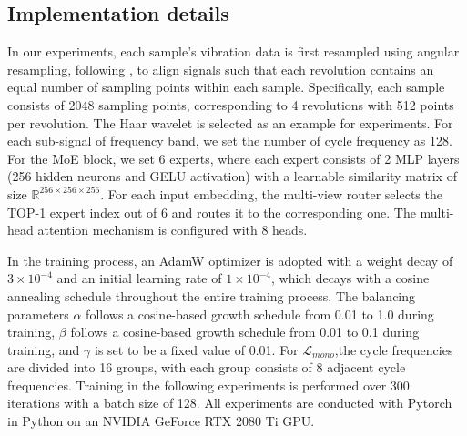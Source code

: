\documentclass{article}
\begin{document}
	\subsection{Implementation details}
	In our experiments, each sample’s vibration data is first resampled using angular resampling, following \cite{RN46}, to align signals such that each revolution contains an equal number of sampling points within each sample. Specifically, each sample consists of 2048 sampling points, corresponding to 4 revolutions with 512 points per revolution. The Haar wavelet is selected as an example for experiments. For each sub-signal of frequency band, we set the number of cycle frequency as 128. For the MoE block, we set 6 experts, where each expert consists of 2 MLP layers (256 hidden neurons and GELU activation) with a learnable similarity matrix of size $\mathbb{R}^{256\times 256\times 256}$. For each input embedding, the multi-view router selects the TOP-1 expert index out of 6 and routes it to the corresponding one. The multi-head attention mechanism is configured with 8 heads.
	
	In the training process, an AdamW optimizer is adopted with a weight decay of $3\times10^{-4}$ and an initial learning rate of $1\times10^{-4}$, which decays with a cosine annealing schedule throughout the entire training process. The balancing parameters $\alpha$ follows a cosine-based growth schedule from 0.01 to 1.0 during training, $\beta$ follows a cosine-based growth schedule from 0.01 to 0.1 during training, and $\gamma$ is set to be a fixed value of 0.01. For $\mathcal{L}_{mono}$,the cycle frequencies are divided into 16 groups, with each group consists of 8 adjacent cycle frequencies. Training in the following experiments is performed over 300 iterations with a batch size of 128. All experiments are conducted with Pytorch in Python on an NVIDIA GeForce RTX 2080 Ti GPU.
	
\end{document}
